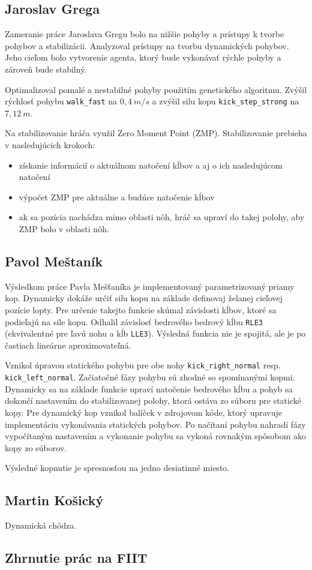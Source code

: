 \subsection{Jaroslav Grega}
Zameranie práce Jaroslava Gregu \cite{grega} bolo na nižšie pohyby a prístupy k tvorbe pohybov a stabilizácii. Analyzoval prístupy na tvorbu dynamických pohybov. Jeho cieľom bolo vytvorenie agenta, ktorý bude vykonávať rýchle pohyby a zároveň bude stabilný. 

Optimalizoval pomalé a nestabilné pohyby použitím genetického algoritmu. Zvýšil rýchlosť pohybu \texttt{walk\_fast} na $0,4~m/s$ a zvýšil silu kopu \texttt{kick\_step\_strong} na $7,12~m$.

Na stabilizovanie hráča využil Zero Moment Point (ZMP). Stabilizovanie prebieha v nasledujúcich krokoch:
\begin{itemize}
	\item získanie informácií o aktuálnom natočení kĺbov a aj o ich nasledujúcom natočení
	\item výpočet ZMP pre aktuálne a budúce natočenie kĺbov
	\item ak sa pozícia nachádza mimo oblasti nôh, hráč sa upraví do takej polohy, aby ZMP bolo v oblasti nôh.
\end{itemize}

\subsection{Pavol Meštaník} \label{sec_mestanik}

Výsledkom práce Pavla Mešťaníka \cite{mestanik} je implementovaný parametrizovaný priamy kop. Dynamicky dokáže určiť silu kopu na základe definovaj želanej cieľovej pozície lopty. Pre určenie takejto funkcie skúmal závislosti kĺbov, ktoré sa podieľajú na sile kopu. Odhalil závislosť bedrového bedrový kĺbu \texttt{RLE3} (ekvivalentné pre ľavú nohu a kĺb \texttt{LLE3}). Výsledná funkcia nie je spojitá, ale je po častiach lineárne aproximovateľná. 

Vznikol úpravou statického pohybu pre obe nohy \texttt{kick\_right\_normal} resp. \texttt{kick\_left\_normal}. Začiatočné fázy pohybu sú zhodné so spomínanými kopmi. Dynamicky sa na základe funkcie upraví natočenie bedrového kĺbu a pohyb sa dokončí nastavením do stabilizovanej polohy, ktorá ostáva zo súboru pre statické kopy. Pre dynamický kop vznikol balíček v zdrojovom kóde, ktorý upravuje implementáciu vykonávania statických pohybov. Po načítaní pohybu nahradí fázy vypočítaným nastavením a vykonanie pohybu sa vykoná rovnakým spôsobom ako kopy zo súborov.

Výsledné kopnutie je spresnosťou na jedno desiatinné miesto.

\subsection{Martin Košický}
Dynamická chôdza.
\subsection{Zhrnutie prác na FIIT}